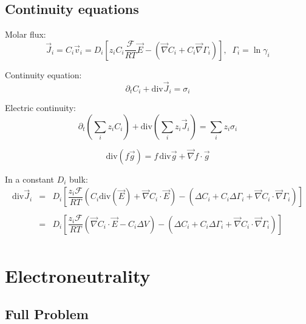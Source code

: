 \documentclass[aps,12pt]{revtex4}
\begin{document}
\subsection{Continuity equations}

Molar flux:
\begin{equation}
	\vec{J}_i = C_i \vec{v}_i = D_i \left[z_i C_i  \dfrac{\mathcal{F}}{RT} \vec{E} - \left(\vec{\nabla} C_i + C_i \vec{\nabla}\Gamma_i\right) \right],\;\;\Gamma_i = \ln \gamma_i
\end{equation}

Continuity equation:
\begin{equation}
	\partial_t C_i + \mathrm{div} \vec{J}_i = \sigma_i
\end{equation}

Electric continuity:
\begin{equation}
	\partial_t \left(\sum_i z_i C_i\right) + \mathrm{div} \left(\sum_i z_i \vec{J}_i\right) = \sum_i z_i \sigma_i
\end{equation}


\begin{equation}
	\mathrm{div}(f\vec{g}) = f \, \mathrm{div}\vec{g} + \vec{\nabla} f \cdot \vec{g}
\end{equation}

In a constant $D_i$ bulk:
\begin{equation}
\begin{array}{rcl}
\mathrm{div} \vec{J}_i & = & D_i \left[ \dfrac{z_i\mathcal{F}}{RT} 
\left(C_i \mathrm{div}\left(\vec{E}\right) + \vec{\nabla} C_i \cdot \vec{E} \right) 
- \left( \Delta C_i + C_i \Delta \Gamma_i + \vec{\nabla} C_i \cdot \vec{\nabla} \Gamma_i \right)
\right]\\
\\
 & = &  D_i \left[ \dfrac{z_i\mathcal{F}}{RT} 
\left(  \vec{\nabla} C_i \cdot \vec{E} - C_i \Delta V \right) 
- \left( \Delta C_i + C_i \Delta \Gamma_i + \vec{\nabla} C_i \cdot \vec{\nabla} \Gamma_i \right)
\right]\\
\end{array}
\end{equation}

\section{Electroneutrality}

\subsection{Full Problem}
\end{document}
